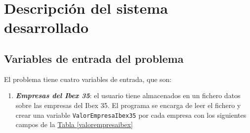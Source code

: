 \documentclass[11pt,openany]{book} %
\begin{document}
\chapter{Descripción del sistema desarrollado}

\section{Variables de entrada del problema}

El problema tiene cuatro variables de entrada, que son:

\begin{enumerate}[\color{ocre}{$\bullet$}]
    \item \textit{\textbf{\textcolor{ocre}{Empresas del Ibex 35}}}: el usuario tiene almacenados en un fichero datos sobre las empresas del Ibex 35. El programa se encarga de leer el fichero y crear una variable \texttt{\textcolor{ocre}{ValorEmpresaIbex35}} por cada empresa con los siguientes campos de la \hyperref[valorempresaibex]{Tabla \ref*{valorempresaibex}}


\end{enumerate}
\end{document}
